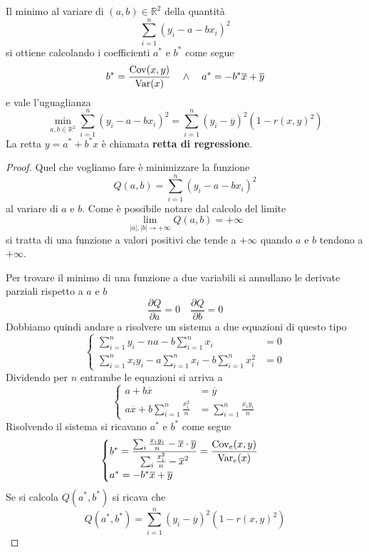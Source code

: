 \begin{theorem}
	Il minimo al variare di $(a, b) \in \mathbb{R}^2$ della quantità
	\[ \sum_{i=1}^n (y_i - a - b x_i)^2 \]
	si ottiene calcolando i coefficienti $a^*$ e $b^*$ come segue
	\[ b^* = \frac{\operatorname{Cov}(x, y)}{\operatorname{Var}(x)} \quad \wedge \quad a^* = -b^* \overline{x} + \overline{y} \]
	e vale l'uguaglianza
	\[
		\min_{a, b \in \mathbb{R}^2} \sum_{i=1}^n (y_i - a - b x_i)^2 =
		\sum_{i=1}^n (y_i - \overline{y})^2 (1 - r(x, y)^2)
	\]
	La retta $y = a^* + b^* x$ è chiamata \textbf{retta di regressione}.
	\begin{proof}
		Quel che vogliamo fare è minimizzare la funzione
		\[ Q(a, b) = \sum_{i=1}^n (y_i - a - b x_i)^2 \]
		al variare di $a$ e $b$. Come è possibile notare dal calcolo del limite
		\[ \lim_{|a|, |b| \to +\infty} Q(a, b) = +\infty \]
		si tratta di una funzione a valori positivi che tende a $+\infty$ quando $a$ e $b$
		tendono a $+\infty$.

		Per trovare il minimo di una funzione a due variabili si annullano le derivate parziali rispetto a
		$a$ e $b$
		\[ \frac{\partial Q}{\partial a} = 0 \quad \frac{\partial Q}{\partial b} = 0 \]
		Dobbiamo quindi andare a risolvere un sistema a due equazioni di questo tipo
		\[
			\begin{cases}
				\sum_{i=1}^n y_i - n a - b \sum_{i=1}^n x_i                      & = 0 \\
				\sum_{i=1}^n x_i y_i - a \sum_{i=1}^n x_i - b \sum_{i=1}^n x_i^2 & = 0
			\end{cases}
		\]
		Dividendo per $n$ entrambe le equazioni si arriva a
		\[
			\begin{cases}
				a + b \overline{x}                              & = \overline{y}                   \\
				a \overline{x} + b \sum_{i=1}^n \frac{x_i^2}{n} & = \sum_{i=1}^n \frac{x_i y_i}{n}
			\end{cases}
		\]
		Risolvendo il sistema si ricavano $a^*$ e $b^*$ come segue
		\[
			\begin{cases}
				b^* = \displaystyle\frac{\sum_i \frac{x_i y_i}{n} - \overline{x} \cdot \overline{y}}
				{\sum_i \frac{x_i^2}{n} - \overline{x}^2} =
				\frac{\operatorname{Cov}_e(x, y)}{\operatorname{Var}_e(x)}         \\
				a^* = -b^* \overline{x} + \overline{y} \\
			\end{cases}
		\]
		Se si calcola $Q(a^*, b^*)$ si ricava che
		\[ Q(a^*, b^*) = \sum_{i=1}^n (y_i - \overline{y})^2 (1 - r(x, y)^2) \]
	\end{proof}
\end{theorem}

